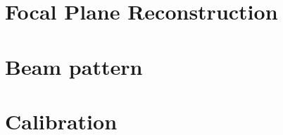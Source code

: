 \documentclass[a4paper, 11pt]{article} %
\begin{document}
\clearpage
\section{Focal Plane Reconstruction}
\label{se:fp_reconstruction}




\clearpage


\clearpage
\section{Beam pattern}
\label{se:beams}



\clearpage
\section{Calibration}
\label{se:calibration}


\label{se:cal_HA}


\label{se:ref_flux}


\label{se:cal_JFL}
\end{document}
